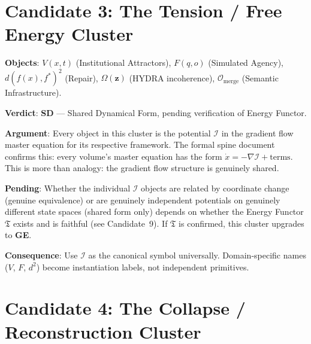 \documentclass[11pt, a4paper]{book}
\theoremstyle{flyxion}
\theoremstyle{remark}
\begin{document}
\section{Candidate 3: The Tension / Free Energy Cluster}

\begin{flybox}
\textbf{Objects}: $V(x,t)$ (Institutional Attractors), $F(q,o)$
(Simulated Agency), $d(f(x),f^*)^2$ (Repair), $\Omega(\mathbf{z})$
(HYDRA incoherence), $\mathcal{O}_\mathrm{merge}$ (Semantic
Infrastructure).

\textbf{Verdict}: \textbf{SD} --- Shared Dynamical Form, pending
verification of Energy Functor.

\textbf{Argument}: Every object in this cluster is the potential
$\mathcal{I}$ in the gradient flow master equation for its respective
framework. The formal spine document confirms this: every volume's
master equation has the form $\dot{x} = -\nabla\mathcal{I} +
\text{terms}$. This is more than analogy: the gradient flow structure
is genuinely shared.

\textbf{Pending}: Whether the individual $\mathcal{I}$ objects are
related by coordinate change (genuine equivalence) or are genuinely
independent potentials on genuinely different state spaces (shared
form only) depends on whether the Energy Functor $\mathfrak{T}$
exists and is faithful (see Candidate~9). If $\mathfrak{T}$ is
confirmed, this cluster upgrades to \textbf{GE}.

\textbf{Consequence}: Use $\mathcal{I}$ as the canonical symbol
universally. Domain-specific names ($V$, $F$, $d^2$) become
instantiation labels, not independent primitives.
\end{flybox}

\section{Candidate 4: The Collapse / Reconstruction Cluster}
\end{document}
